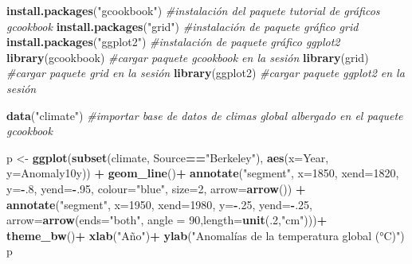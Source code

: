 \documentclass[
]{article}
\newenvironment{Shaded}{\begin{snugshade}}{\end{snugshade}}
\newcommand{\CommentTok}[1]{\textcolor[rgb]{0.56,0.35,0.01}{\textit{#1}}}
\newcommand{\DataTypeTok}[1]{\textcolor[rgb]{0.13,0.29,0.53}{#1}}
\newcommand{\DecValTok}[1]{\textcolor[rgb]{0.00,0.00,0.81}{#1}}
\newcommand{\KeywordTok}[1]{\textcolor[rgb]{0.13,0.29,0.53}{\textbf{#1}}}
\newcommand{\NormalTok}[1]{#1}
\newcommand{\OperatorTok}[1]{\textcolor[rgb]{0.81,0.36,0.00}{\textbf{#1}}}
\newcommand{\StringTok}[1]{\textcolor[rgb]{0.31,0.60,0.02}{#1}}
\begin{document}
\begin{Shaded}
\begin{Highlighting}[]
\KeywordTok{install.packages}\NormalTok{(}\StringTok{"gcookbook"}\NormalTok{) }\CommentTok{#instalación del paquete tutorial de gráficos gcookbook}
\KeywordTok{install.packages}\NormalTok{(}\StringTok{"grid"}\NormalTok{) }\CommentTok{#instalación de paquete gráfico grid}
\KeywordTok{install.packages}\NormalTok{(}\StringTok{"ggplot2"}\NormalTok{) }\CommentTok{#instalación de paquete gráfico ggplot2}
\KeywordTok{library}\NormalTok{(gcookbook) }\CommentTok{#cargar paquete gcookbook en la sesión}
\KeywordTok{library}\NormalTok{(grid) }\CommentTok{#cargar paquete grid en la sesión}
\KeywordTok{library}\NormalTok{(ggplot2) }\CommentTok{#cargar paquete ggplot2 en la sesión}

\KeywordTok{data}\NormalTok{(}\StringTok{"climate"}\NormalTok{) }\CommentTok{#importar base de datos de climas global albergado en el paquete gcookbook }

\NormalTok{p <-}\StringTok{ }\KeywordTok{ggplot}\NormalTok{(}\KeywordTok{subset}\NormalTok{(climate, Source}\OperatorTok{==}\StringTok{"Berkeley"}\NormalTok{), }\KeywordTok{aes}\NormalTok{(}\DataTypeTok{x=}\NormalTok{Year, }\DataTypeTok{y=}\NormalTok{Anomaly10y)) }\OperatorTok{+}
\StringTok{      }\KeywordTok{geom_line}\NormalTok{()}\OperatorTok{+}
\StringTok{      }\KeywordTok{annotate}\NormalTok{(}\StringTok{"segment"}\NormalTok{, }\DataTypeTok{x=}\DecValTok{1850}\NormalTok{, }\DataTypeTok{xend=}\DecValTok{1820}\NormalTok{, }\DataTypeTok{y=}\OperatorTok{-}\NormalTok{.}\DecValTok{8}\NormalTok{, }\DataTypeTok{yend=}\OperatorTok{-}\NormalTok{.}\DecValTok{95}\NormalTok{, }\DataTypeTok{colour=}\StringTok{"blue"}\NormalTok{, }\DataTypeTok{size=}\DecValTok{2}\NormalTok{, }\DataTypeTok{arrow=}\KeywordTok{arrow}\NormalTok{()) }\OperatorTok{+}
\StringTok{      }\KeywordTok{annotate}\NormalTok{(}\StringTok{"segment"}\NormalTok{, }\DataTypeTok{x=}\DecValTok{1950}\NormalTok{, }\DataTypeTok{xend=}\DecValTok{1980}\NormalTok{, }\DataTypeTok{y=}\OperatorTok{-}\NormalTok{.}\DecValTok{25}\NormalTok{, }\DataTypeTok{yend=}\OperatorTok{-}\NormalTok{.}\DecValTok{25}\NormalTok{, }\DataTypeTok{arrow=}\KeywordTok{arrow}\NormalTok{(}\DataTypeTok{ends=}\StringTok{"both"}\NormalTok{, }\DataTypeTok{angle =} \DecValTok{90}\NormalTok{,}\DataTypeTok{length=}\KeywordTok{unit}\NormalTok{(.}\DecValTok{2}\NormalTok{,}\StringTok{"cm"}\NormalTok{)))}\OperatorTok{+}
\StringTok{      }\KeywordTok{theme_bw}\NormalTok{()}\OperatorTok{+}
\StringTok{      }\KeywordTok{xlab}\NormalTok{(}\StringTok{"Año"}\NormalTok{)}\OperatorTok{+}
\StringTok{      }\KeywordTok{ylab}\NormalTok{(}\StringTok{"Anomalías de la temperatura global (°C)"}\NormalTok{)}
\NormalTok{p  }
\end{Highlighting}
\end{Shaded}
\end{document}
